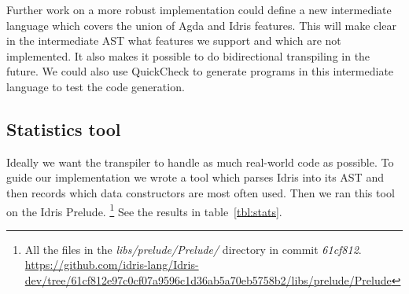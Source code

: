 \documentclass[parskip=half]{scrartcl}
\begin{document}


Further work on a more robust implementation could define a new intermediate
language which covers the union of Agda and Idris features.
This will make clear in the intermediate AST what features we support and which
are not implemented.
It also makes it possible to do bidirectional transpiling in the future.
We could also use QuickCheck to generate programs in this intermediate language
to test the code generation.


\subsection{Statistics tool}
Ideally we want the transpiler to handle as much real-world code as possible.
To guide our implementation we wrote a tool which parses Idris into its AST and
then records which data constructors are most often used. Then we ran this tool
on the Idris Prelude.
\footnote{ All the files in the \textit{libs/prelude/Prelude/} directory in commit \textit{61cf812}.
\url{https://github.com/idris-lang/Idris-dev/tree/61cf812e97c0cf07a9596c1d36ab5a70eb5758b2/libs/prelude/Prelude}}
See the results in table~\ref{tbl:stats}.
\end{document}
